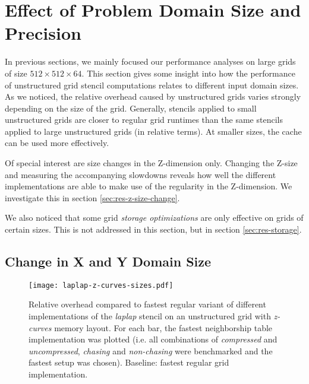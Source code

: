 \section{Effect of Problem Domain Size and Precision} \label{sec:res-size}

In previous sections, we mainly focused our performance analyses on large grids of size $512\times 512\times 64$. This section gives some insight into how the performance of unstructured grid stencil computations relates to different input domain sizes. As we noticed, the relative overhead caused by unstructured grids varies strongly depending on the size of the grid. Generally, stencils applied to small unstructured grids are closer to regular grid runtimes than the same stencils applied to large unstructured grids (in relative terms). At smaller sizes, the cache can be used more effectively.

Of special interest are size changes in the Z-dimension only. Changing the Z-size and measuring the accompanying slowdowns reveals how well the different implementations are able to make use of the regularity in the Z-dimension. We investigate this in section \ref{sec:res-z-size-change}.

We also noticed that some grid \emph{storage optimizations} are only effective on grids of certain sizes. This is not addressed in this section, but in section \ref{sec:res-storage}.

\subsection{Change in X and Y Domain Size}

\begin{figure}
	\begin{center}
    \texttt{[image: laplap-z-curves-sizes.pdf]}
	\end{center}
    \caption{\label{fig:variants-gridsizes} Relative overhead compared to fastest regular variant of different implementations of the \emph{laplap} stencil on an unstructured grid with \emph{z-curves} memory layout. For each bar, the fastest neighborship table implementation was plotted (i.e. all combinations of \emph{compressed} and \emph{uncompressed}, \emph{chasing} and \emph{non-chasing} were benchmarked and the fastest setup was chosen). Baseline: fastest regular grid implementation.}
\end{figure}

